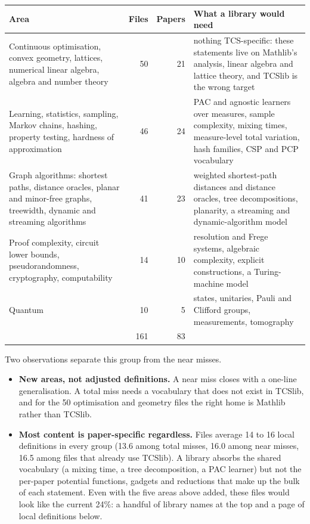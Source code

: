 \documentclass[11pt]{article}
\begin{document}
\begin{center}
\begin{tabular}{@{}R{6.2cm}rrR{6cm}@{}}
\toprule
Area & Files & Papers & What a library would need \\
\midrule
Continuous optimisation, convex geometry, lattices, numerical linear algebra, algebra and number theory & 50 & 21 & nothing TCS-specific: these statements live on Mathlib's analysis, linear algebra and lattice theory, and TCSlib is the wrong target \\
Learning, statistics, sampling, Markov chains, hashing, property testing, hardness of approximation & 46 & 24 & PAC and agnostic learners over measures, sample complexity, mixing times, measure-level total variation, hash families, CSP and PCP vocabulary \\
Graph algorithms: shortest paths, distance oracles, planar and minor-free graphs, treewidth, dynamic and streaming algorithms & 41 & 23 & weighted shortest-path distances and distance oracles, tree decompositions, planarity, a streaming and dynamic-algorithm model \\
Proof complexity, circuit lower bounds, pseudorandomness, cryptography, computability & 14 & 10 & resolution and Frege systems, algebraic complexity, explicit constructions, a Turing-machine model \\
Quantum & 10 & 5 & states, unitaries, Pauli and Clifford groups, measurements, tomography \\
\midrule
 & 161 & 83 & \\
\bottomrule
\end{tabular}
\end{center}

Two observations separate this group from the near misses.

\begin{itemize}[leftmargin=1.4em]
\item \textbf{New areas, not adjusted definitions.} A near miss closes with a one-line
generalisation. A total miss needs a vocabulary that does not exist in TCSlib, and for the 50
optimisation and geometry files the right home is Mathlib rather than TCSlib.
\item \textbf{Most content is paper-specific regardless.} Files average 14 to 16 local definitions
in every group (13.6 among total misses, 16.0 among near misses, 16.5 among files that already
use TCSlib). A library absorbs the shared vocabulary (a mixing time, a tree decomposition, a PAC
learner) but not the per-paper potential functions, gadgets and reductions that make up the bulk
of each statement. Even with the five areas above added, these files would look like the
current 24\%: a handful of library names at the top and a page of local definitions below.
\end{itemize}
\end{document}
